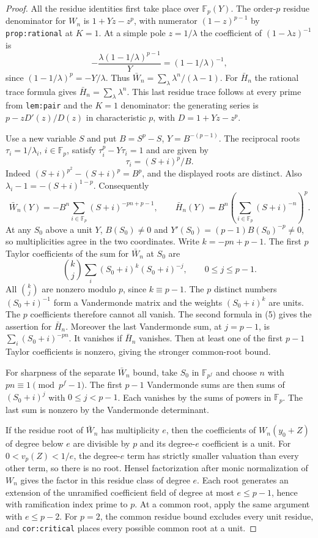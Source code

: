 \documentclass[11pt]{article}
\begin{document}
\begin{proof}
All the residue identities first take place over $\mathbb F_p(Y)$.
The order-$p$ residue denominator for $W_n$ is
$1+Yz-z^p$, with numerator $(1-z)^{p-1}$ by
\texttt{prop:rational} at $K=1$.
At a simple pole $z=1/\lambda$ the coefficient of
$(1-\lambda z)^{-1}$ is
\[
 -\frac{\lambda(1-1/\lambda)^{p-1}}{Y}
                     =(1-1/\lambda)^{-1},
\]
since $(1-1/\lambda)^p=-Y/\lambda$.
Thus $\bar W_n=\sum_\lambda\lambda^n/(\lambda-1)$.
For $\bar H_n$ the rational trace formula gives
$\bar H_n=\sum_\lambda\lambda^n$. This last residue trace follows
at every prime from \texttt{lem:pair} and the $K=1$ denominator:
the generating series is $p-zD'(z)/D(z)$ in characteristic $p$,
with $D=1+Yz-z^p$.

Use a new variable $S$ and put $B=S^p-S$, $Y=B^{-(p-1)}$.
The reciprocal roots $\tau_i=1/\lambda_i$, $i\in\mathbb F_p$,
satisfy $\tau_i^p-Y\tau_i=1$ and are given by
\[
                  \tau_i=(S+i)^p/B .
\]
Indeed $(S+i)^{p^2}-(S+i)^p=B^p$, and the displayed
roots are distinct. Also $\lambda_i-1=-(S+i)^{1-p}$.
Consequently
\[
 \bar W_n(Y)=-B^n\sum_{i\in\mathbb F_p}(S+i)^{-pn+p-1},
 \qquad
 \bar H_n(Y)=B^n\left(\sum_{i\in\mathbb F_p}(S+i)^{-n}\right)^p.
 \tag{5}
\]
At any $S_0$ above a unit $Y$, $B(S_0)\ne0$ and
$Y'(S_0)=(p-1)B(S_0)^{-p}\ne0$, so multiplicities
agree in the two coordinates.
Write $k=-pn+p-1$. The first $p$ Taylor coefficients of
the sum for $\bar W_n$ at $S_0$ are
\[
 \binom{k}{j}\sum_i (S_0+i)^k (S_0+i)^{-j},
                  \qquad 0\le j\le p-1 .
\]
All $\binom{k}{j}$ are nonzero modulo $p$, since $k\equiv p-1$.
The $p$ distinct numbers $(S_0+i)^{-1}$ form a Vandermonde
matrix and the weights $(S_0+i)^k$ are units.
The $p$ coefficients therefore cannot all vanish.
The second formula in (5) gives the assertion for $\bar H_n$.
Moreover the last Vandermonde sum, at $j=p-1$, is
$\sum_i(S_0+i)^{-pn}$. It vanishes if $\bar H_n$ vanishes.
Then at least one of the first $p-1$ Taylor coefficients
is nonzero, giving the stronger common-root bound.

For sharpness of the separate $\bar W_n$ bound, take $S_0$
in $\mathbb F_{p^f}$ and choose $n$ with
$pn\equiv1\pmod{p^f-1}$. The first $p-1$ Vandermonde sums
are then sums of $(S_0+i)^j$ with $0\le j<p-1$.
Each vanishes by the sums of powers in $\mathbb F_p$.
The last sum is nonzero by the Vandermonde determinant.

If the residue root of $\bar W_n$ has multiplicity $e$,
then the coefficients of $W_n(y_0+Z)$ of degree below $e$
are divisible by $p$ and its degree-$e$ coefficient is a unit.
For $0<v_p(Z)<1/e$, the degree-$e$ term has strictly smaller
valuation than every other term, so there is no root.
Hensel factorization after monic normalization of $W_n$
gives the factor in this residue class of degree $e$.
Each root generates an extension of the unramified coefficient
field of degree at most $e\le p-1$, hence with ramification
index prime to $p$. At a common root, apply the same argument
with $e\le p-2$. For $p=2$, the common residue bound excludes
every unit residue, and \texttt{cor:critical} places every
possible common root at a unit.
\end{proof}
\end{document}
